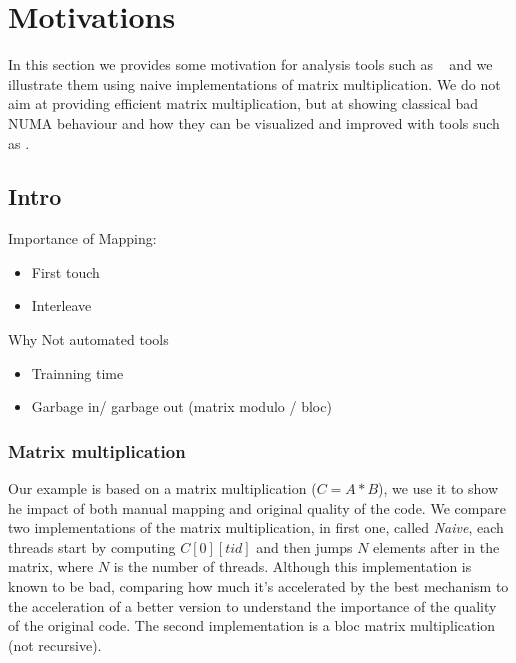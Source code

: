 
\section{Motivations}
\label{sec:motivations}

In this section we provides some motivation for analysis tools such as
\TABARNAC~ and we illustrate them using naive implementations of matrix
multiplication. We do not aim at providing efficient matrix multiplication,
but at showing classical bad NUMA behaviour and how they can be visualized and
improved with tools such as \TABARNAC.

\subsection{Intro}
\label{sec:motivations-intro}

Importance of Mapping:
\begin{itemize}
    \item First touch
    \item Interleave
\end{itemize}

Why Not automated tools
\begin{itemize}
    \item Trainning time
    \item Garbage in/ garbage out (matrix modulo / bloc)
\end{itemize}

\subsubsection{Matrix multiplication}
\label{sec:motiv-mat}

Our example is based on a matrix multiplication ($C=A*B$), we use it to show
he impact of both manual mapping and original quality of the code. We compare
two implementations of the matrix multiplication, in first one, called
\emph{Naive}, each threads start by computing $C[0][tid]$ and then jumps $N$
elements after in the matrix, where $N$ is the number of threads. Although
this implementation is known to be bad, comparing how much it's accelerated by
the best mechanism to the acceleration of a better version to understand the
importance of the quality of the original code.  The
second implementation is a bloc matrix multiplication (not recursive).

